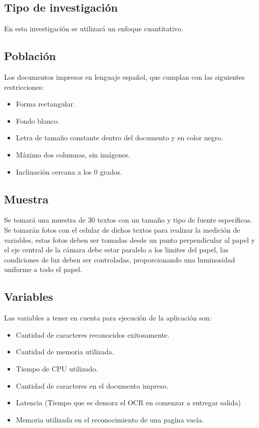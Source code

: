 \documentclass[a4paper, 11pt, oneside]{article}
\begin{document}
	\subsection{Tipo de investigación}
	En esta investigación se utilizará un enfoque cuantitativo.
	
	\subsection{Población}
	Los documentos impresos en lenguaje español, que cumplan con las siguientes restricciones:
	\begin{itemize}
	\item Forma rectangular.
	\item Fondo blanco.
	\item Letra de tamaño constante dentro del documento y en color negro.
	\item Máximo dos columnas, sin imágenes.
	\item Inclinación cercana a los 0 grados.
	\end{itemize}


	\subsection{Muestra}
	Se tomará una muestra de 30 textos con un tamaño y tipo de fuente específicas. Se tomarán
	fotos con el celular de dichos textos para realizar la medición de variables, estas fotos deben ser
	tomadas desde un punto perpendicular al papel y el eje central de la cámara debe estar paralelo a 
	los limites del papel, las condiciones de luz deben ser controladas, proporcionando una luminosidad
	uniforme a todo el papel.
	
	\subsection{Variables}
	Las variables a tener en cuenta para ejecución de la aplicación son:
	\begin{itemize}
	\item Cantidad de caracteres reconocidos exitosamente.
	\item Cantidad de memoria utilizada.
	\item Tiempo de CPU utilizado.
	\item Cantidad de caracteres en el documento impreso.
	\item Latencia (Tiempo que se demora el OCR en comenzar a entregar salida)
	\item Memoria utilizada en el reconocimiento de una pagina vacía.
	\end{itemize}
	\clearpage
	
\end{document}
